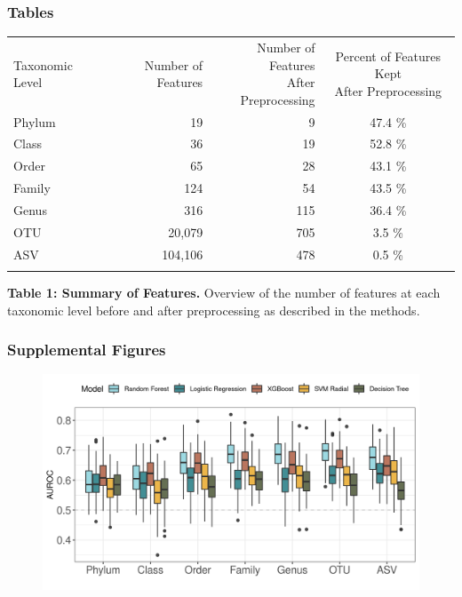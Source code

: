 \documentclass[]{article}
\begin{document}
\subsubsection{Tables}\label{tables}

\begin{longtable}[c]{@{}lrrc@{}}
\toprule\addlinespace
Taxonomic Level & Number of Features &
\makecell[c]{Number of Features \\ After Preprocessing} &
\makecell[c]{Percent of Features Kept \\ After Preprocessing}
\\\addlinespace
\midrule\endhead
Phylum & 19 & 9 & 47.4 \%
\\\addlinespace
Class & 36 & 19 & 52.8 \%
\\\addlinespace
Order & 65 & 28 & 43.1 \%
\\\addlinespace
Family & 124 & 54 & 43.5 \%
\\\addlinespace
Genus & 316 & 115 & 36.4 \%
\\\addlinespace
OTU & 20,079 & 705 & 3.5 \%
\\\addlinespace
ASV & 104,106 & 478 & 0.5 \%
\\\addlinespace
\bottomrule
\end{longtable}

\textbf{Table 1: Summary of Features.} Overview of the number of
features at each taxonomic level before and after preprocessing as
described in the methods.

\newpage

\subsubsection{Supplemental Figures}\label{supplemental-figures}

\begin{figure}[htbp]
\centering
\includegraphics{figure_s1.png}
\end{figure}
\end{document}
